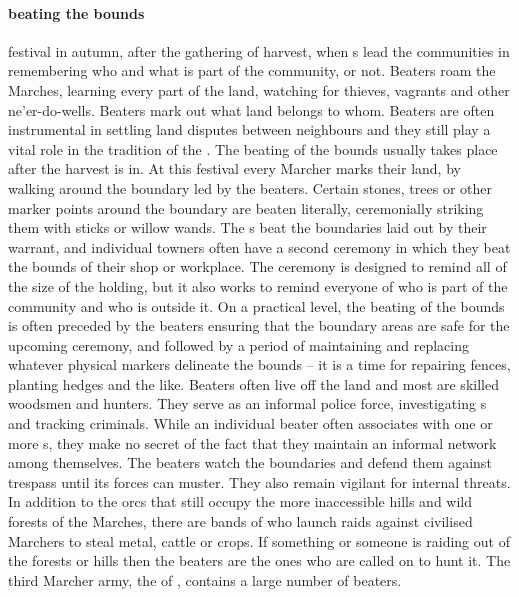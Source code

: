 \paragraph{beating the bounds} festival in autumn, after the gathering of harvest, when s lead the communities in remembering who and what is part of the community, or not.  
 Beaters roam the Marches, learning every part of the land, watching for thieves, vagrants and other ne'er-do-wells. Beaters mark out what land belongs to whom.  Beaters are often instrumental in settling land disputes between neighbours and they still play a vital role in the tradition of the . \localpar The beating of the bounds usually takes place after the harvest is in. At this festival every Marcher marks their land, by walking around the boundary led by the beaters. Certain stones, trees or other marker points around the boundary are beaten literally, ceremonially striking them with sticks or willow wands. The s beat the boundaries laid out by their warrant, and individual towners often have a second ceremony in which they beat the bounds of their shop or workplace. The ceremony is designed to remind all of the size of the holding, but it also works to remind everyone of who is part of the community and who is outside it. On a practical level, the beating of the bounds is often preceded by the beaters ensuring that the boundary areas are safe for the upcoming ceremony, and followed by a period of maintaining and replacing whatever physical markers delineate the bounds – it is a time for repairing fences, planting hedges and the like. \localpar Beaters often live off the land and most are skilled woodsmen and hunters. They serve as an informal police force, investigating s and tracking criminals. While an individual beater often associates with one or more s, they make no secret of the fact that they maintain an informal network among themselves. The beaters watch the boundaries and defend them against trespass until its forces can muster. They also remain vigilant for internal threats. In addition to the orcs that still occupy the more inaccessible hills and wild forests of the Marches, there are bands of  who launch raids against civilised Marchers to steal metal, cattle or crops. If something or someone is raiding out of the forests or hills then the beaters are the ones who are called on to hunt it. \localpar The third Marcher army, the  of , contains a large number of beaters.\bigparagraphendtwiddle
